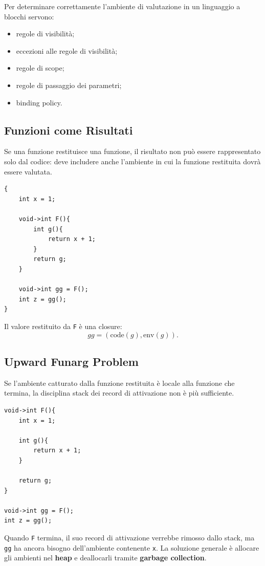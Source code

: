 \documentclass{article}
\begin{document}
Per determinare correttamente l'ambiente di valutazione in un linguaggio a blocchi servono:
\begin{itemize}
  \item regole di visibilità;
  \item eccezioni alle regole di visibilità;
  \item regole di scope;
  \item regole di passaggio dei parametri;
  \item binding policy.
\end{itemize}

\subsection{Funzioni come Risultati}

Se una funzione restituisce una funzione, il risultato non può essere rappresentato solo dal codice: deve includere anche l'ambiente in cui la funzione restituita dovrà essere valutata.

\begin{lstlisting}
{
    int x = 1;

    void->int F(){
        int g(){
            return x + 1;
        }
        return g;
    }

    void->int gg = F();
    int z = gg();
}
\end{lstlisting}

Il valore restituito da \texttt{F} è una closure:
\[
gg = (\mathrm{code}(g), \mathrm{env}(g)).
\]

\subsection{Upward Funarg Problem}

Se l'ambiente catturato dalla funzione restituita è locale alla funzione che termina, la disciplina stack dei record di attivazione non è più sufficiente.

\begin{lstlisting}
void->int F(){
    int x = 1;

    int g(){
        return x + 1;
    }

    return g;
}

void->int gg = F();
int z = gg();
\end{lstlisting}

Quando \texttt{F} termina, il suo record di attivazione verrebbe rimosso dallo stack, ma \texttt{gg} ha ancora bisogno dell'ambiente contenente \texttt{x}. La soluzione generale è allocare gli ambienti nel \textbf{heap} e deallocarli tramite \textbf{garbage collection}.
\end{document}
